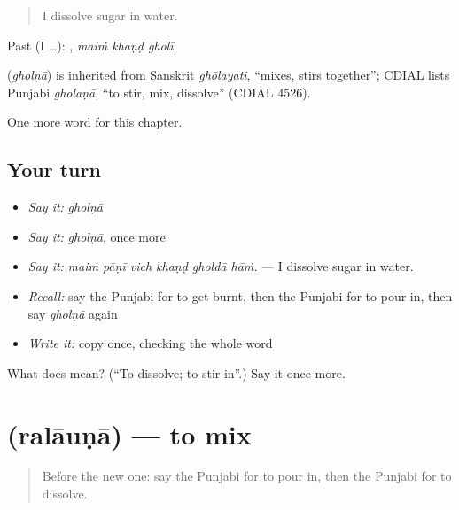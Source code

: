 \begin{quote}
I dissolve sugar in water.
\end{quote}

Past (I …):   , \emph{maiṁ khaṇḍ gholī}.

\begin{cousinweb}
\textbf{} (\emph{gholṇā}) is inherited from Sanskrit \emph{ghōlayati}, \textquotedblleft{}mixes, stirs together\textquotedblright{}; CDIAL lists Punjabi \emph{gholaṇā}, \textquotedblleft{}to stir, mix, dissolve\textquotedblright{} (CDIAL 4526).
\end{cousinweb}

\begin{grammarlens}[title={What you've built}]
One more word for this chapter.
\end{grammarlens}

\subsection*{Your turn}
\begin{itemize}
\raggedright
  \item \emph{Say it:} \emph{gholṇā}
  \item \emph{Say it:} \emph{gholṇā}, once more
  \item \emph{Say it:} \emph{maiṁ pāṇī vich khaṇḍ gholdā hāṁ.} — I dissolve sugar in water.
  \item \emph{Recall:} say the Punjabi for to get burnt, then the Punjabi for to pour in, then say \emph{gholṇā} again
  \item \emph{Write it:} copy \textbf{} once, checking the whole word
\end{itemize}

\begin{tcolorbox}[breakable,colback=teal!4,colframe=teal!35!black,title={Before you move on}]
What does  mean? (\textquotedblleft{}To dissolve; to stir in\textquotedblright{}.) Say it once more.
\end{tcolorbox}
\section[\texorpdfstring{\pa{ਰਲਾਉਣਾ} (ralāuṇā)}{ਰਲਾਉਣਾ (ralāuṇā)}]{ (ralāuṇā) — to mix}

\label{lesson:PA-C243-ralauna}



\begin{quote}
Before the new one: say the Punjabi for to pour in, then the Punjabi for to dissolve.
\end{quote}

